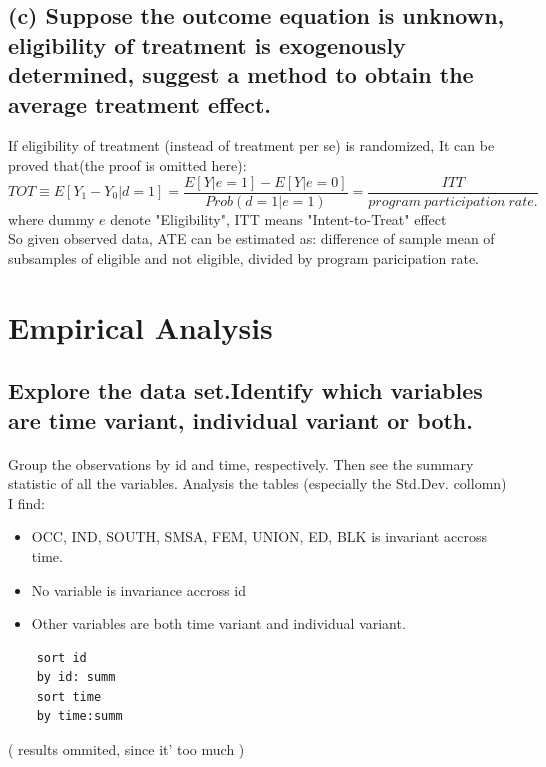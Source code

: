 \documentclass{article}
\begin{document}
\subsection*{(c) Suppose the outcome equation is unknown, eligibility of treatment is exogenously determined, suggest a method to obtain the average treatment effect.}

If eligibility of treatment (instead of treatment per se) is randomized, It can be proved that(the proof is omitted here):
$$ TOT\equiv E[Y_1-Y_0|d=1]=\frac{E[Y|e=1]-E[Y|e=0]}{Prob(d=1|e=1)}=\frac{ITT}{ program\ participation\ rate.} $$
where dummy $e$ denote "Eligibility", ITT means "Intent-to-Treat" effect\\
So given observed data, ATE can be estimated as: difference of sample mean of subsamples of eligible and not eligible, divided by program paricipation rate.


\section{Empirical Analysis}

\subsection{Explore the data set.Identify which variables are time variant, individual variant or both.}

\paragraph{} Group the observations by id and time, respectively. 
Then see the summary statistic of all the variables.
Analysis the tables (especially the Std.Dev. collomn) I find:\\
\begin{itemize}
	\item OCC, IND, SOUTH, SMSA, FEM, UNION, ED, BLK is invariant accross time.
	\item No variable is invariance accross id
	\item Other variables are both time variant and individual variant.
\end{itemize}

\lstset{
	basicstyle=\ttfamily,
	frame=lrtb,  %
	breaklines=true	
}

\begin{lstlisting}
	sort id
	by id: summ
	sort time
	by time:summ	
\end{lstlisting}
( results ommited, since it' too much )
\end{document}
